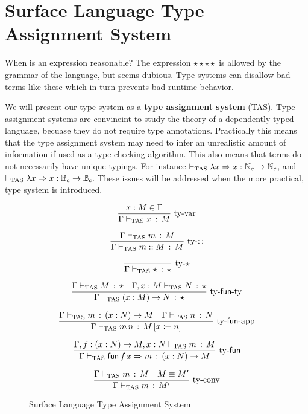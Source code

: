 
\section{Surface Language Type Assignment System}

When is an expression reasonable? The expression $\star\star\star\star$ is allowed by the grammar of the language, but seems dubious.
Type systems can disallow bad terms like these which in turn prevents bad runtime behavior.

We will present our type system as a \textbf{type assignment system} (\ac{TAS}).
Type assignment systems are convineint to study the theory of a dependently typed language, becuase they do not require type annotations. %
Practically this means that the type assignment system may need to infer an unrealistic amount of information if used as a type checking algorithm.
This also means that terms do not necessarily have unique typings.
For instance $\vdash_{\mathrm{TAS}}\lambda x\Rightarrow x:\mathbb{N}_{c}\rightarrow\mathbb{N}_{c}$, and $\vdash_{\mathrm{TAS}}\lambda x\Rightarrow x:\mathbb{B}_{c}\rightarrow\mathbb{B}_{c}$.
These issues will be addressed when the more practical, \bidir{} type system is introduced. 

\begin{figure}
\[
\frac{x:M\in\Gamma}{\Gamma\vdash_{\mathrm{TAS}} x\,:\,M}\,\operatorname{ty-var}
\]

\[
\frac{\Gamma\vdash_{\mathrm{TAS}} m\,:\,M}{\Gamma\vdash_{\mathrm{TAS}} m::M\,:\,M}\,\operatorname{ty-::}
\]

\[
\frac{{\color{gray}\ }}{\Gamma\tasys\star\,:\,\star}\,\rulename{ty-\star}
\]

\[
\frac{\Gamma\vdash_{\mathrm{TAS}} M\,:\,\star\quad\Gamma,x:M\vdash_{\mathrm{TAS}} N\,:\,\star}{\Gamma\vdash_{\mathrm{TAS}}\left(x:M\right)\rightarrow N\,:\,\star}\,\operatorname{ty-\mathsf{fun}-ty}
\]

\[
\frac{\Gamma\vdash_{\mathrm{TAS}} m\,:\,\left(x:N\right)\rightarrow M\quad\Gamma\vdash_{\mathrm{TAS}} n\,:\,N}{\Gamma\vdash_{\mathrm{TAS}} m\,n\,:\,M\left[x\coloneqq n\right]}\,\operatorname{ty-\mathsf{fun}-app}
\]

\[
\frac{\Gamma,f:\left(x:N\right)\rightarrow M,x:N\vdash_{\mathrm{TAS}} m\,:\,M}{\Gamma\vdash_{\mathrm{TAS}}\mathsf{fun}\,f\,x\Rightarrow m\,:\,\left(x:N\right)\rightarrow M}\,\operatorname{ty-\mathsf{fun}}
\]

\[
\frac{\Gamma\vdash_{\mathrm{TAS}} m\,:\,M\quad M\equiv M'}{\Gamma\vdash_{\mathrm{TAS}} m\,:\,M'}\,\operatorname{ty-conv}
\]

\caption{Surface Language Type Assignment System}
\label{fig:surface-TAS}
\end{figure}


